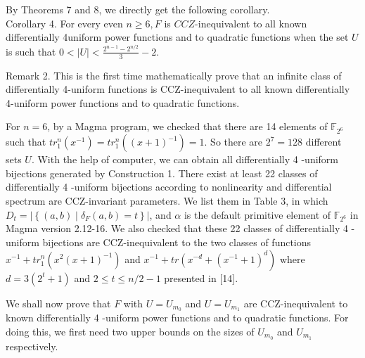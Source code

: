 \documentclass[10pt]{article}
\begin{document}
By Theorems 7 and 8, we directly get the following corollary.\\
Corollary 4. For every even $n \geq 6, F$ is $C C Z$-inequivalent to all known differentially 4uniform power functions and to quadratic functions when the set $U$ is such that $0<|U|< \frac{2^{n-1}-2^{n / 2}}{3}-2$.

Remark 2. This is the first time mathematically prove that an infinite class of differentially 4-uniform functions is CCZ-inequivalent to all known differentially 4-uniform power functions and to quadratic functions.

For $n=6$, by a Magma program, we checked that there are 14 elements of $\mathbb{F}_{2^{6}}$ such that $t r_{1}^{n}\left(x^{-1}\right)=t r_{1}^{n}\left((x+1)^{-1}\right)=1$. So there are $2^{7}=128$ different sets $U$. With the help of computer, we can obtain all differentially 4 -uniform bijections generated by Construction 1. There exist at least 22 classes of differentially 4 -uniform bijections according to nonlinearity and differential spectrum are CCZ-invariant parameters. We list them in Table 3, in which $D_{t}=\left|\left\{(a, b) \mid \delta_{F}(a, b)=t\right\}\right|$, and $\alpha$ is the default primitive element of $\mathbb{F}_{2^{6}}$ in Magma version 2.12-16. We also checked that these 22 classes of differentially 4 -uniform bijections are CCZ-inequivalent to the two classes of functions $x^{-1}+t r_{1}^{n}\left(x^{2}(x+1)^{-1}\right)$ and $x^{-1}+t r\left(x^{-d}+\right. \left.\left(x^{-1}+1\right)^{d}\right)$ where $d=3\left(2^{t}+1\right)$ and $2 \leq t \leq n / 2-1$ presented in [14].

We shall now prove that $F$ with $U=U_{m_{0}}$ and $U=U_{m_{1}}$ are CCZ-inequivalent to known differentially 4 -uniform power functions and to quadratic functions. For doing this, we first need two upper bounds on the sizes of $U_{m_{0}}$ and $U_{m_{1}}$ respectively.
\end{document}
